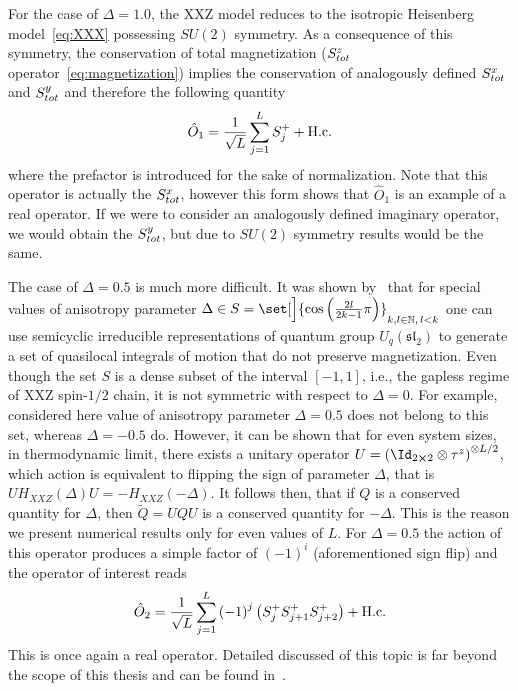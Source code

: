 For the case of \(\Delta=1.0\), the XXZ model reduces to the isotropic Heisenberg model~\eqref{eq:XXX}
possessing \(SU(2)\) symmetry.
As a consequence of this symmetry, the conservation of total magnetization 
(\(S^{z}_{tot}\) operator~\eqref{eq:magnetization}) implies the conservation of analogously defined \(S^{x}_{tot}\)
and \(S^{y}_{tot}\) and therefore the following quantity
\begin{equation}
    \hat{O}_{1} =  \frac{1}{\sqrt{L}}\sum_{j=1}^{L} S^{+}_{j} + \text{H.c.}
    \label{eq:delta 1.0}
\end{equation}
where the prefactor is introduced for the sake of normalization. Note that
this operator is actually the \(S^{x}_{tot}\), however this form shows that \(\hat{O}_1\) 
is an example of a real operator. If we were to consider an analogously defined imaginary operator,
we would obtain the \(S^{y}_{tot}\), but due to \(SU(2)\) symmetry results would be the same.


The case of \(\Delta=0.5\) is much more difficult. It was shown by~\textcite{zadnik2016} that for 
special values of anisotropy parameter \(\Delta \in S = \set[\Big]{\cos\left(\frac{2l}{2k-1}
\pi\right)}_{k,l\in \NN,\, l<k}\) one can use semicyclic irreducible representations
of quantum group \(U_q(\mathfrak{sl}_2)\) to generate a set of quasilocal integrals of 
motion that do not preserve magnetization. Even though the set \(S\) is a dense subset
of the interval \([-1,1]\), i.e., the gapless regime of XXZ spin-\(1/2\) chain, it is not
symmetric with respect to \(\Delta=0\). For example, considered here value of anisotropy parameter
\(\Delta=0.5\) does not belong to this set, whereas \(\Delta=-0.5\) do. However, it can be shown
that for even system sizes, in thermodynamic limit, there exists a unitary operator 
\(U = \left(\Id_{2\cross 2}\otimes \tau^z\right)^{\otimes L/2}\), which action is equivalent to flipping the sign 
of parameter \(\Delta\), that is \(UH_{XXZ}(\Delta)U = -H_{XXZ}(-\Delta)\). It follows then,
that if \(Q\) is a conserved quantity for \(\Delta\), then \(\tilde{Q} = UQU\) is a conserved
quantity for \(-\Delta\). This is the reason we present numerical results only for even 
values of \(L\). For \(\Delta=0.5\) the action
of this operator produces a simple factor of \((-1)^i\) (aforementioned sign flip) and the operator of interest reads
\begin{equation}
  \hat{O}_{2} =\frac{1}{\sqrt{L}} \sum_{j=1}^{L} {(-1)}^j \left( S^{+}_{j}S^{+}_{j+1}S^{+}_{j+2}\right) + \text{H.c.}
  \label{eq:delta 0.5}
\end{equation}  
This is once again a real operator. Detailed discussed of this topic is far beyond the scope of this thesis
and can be found in~\autocite{Ilievski2016a,zadnik2016,Prosen2014c}.

